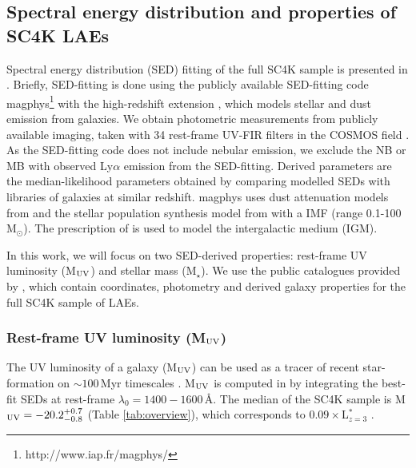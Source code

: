 \documentclass[a4paper,fleqn,usenatbib]{mnras}
\begin{document}
\subsection{Spectral energy distribution and properties of SC4K LAEs}
Spectral energy distribution (SED) fitting of the full SC4K sample is presented in \cite{Santos2020}. Briefly, SED-fitting is done using the publicly available SED-fitting code {\sc magphys}\footnote{http://www.iap.fr/magphys/} \citep{daCunha2008,daCunha2012} with the high-redshift extension \cite[see][]{daCunha2015}, which models stellar and dust emission from galaxies. We obtain photometric measurements from publicly available imaging, taken with 34 rest-frame UV-FIR filters in the COSMOS field  \citep{Capak2007,McCracken2012,Steinhardt2014,Sanders2007,Lutz2011,Oliver2012}. As the SED-fitting code does not include nebular emission, we exclude the NB or MB with observed Ly$\alpha$ emission from the SED-fitting. Derived parameters are the median-likelihood parameters obtained by comparing modelled SEDs with libraries of galaxies at similar redshift. {\sc magphys} uses dust attenuation models from \cite{Charlot2000} and the stellar population synthesis model from \cite{Bruzual2003} with a \cite{Chabrier2003} IMF (range 0.1-100 M$_\odot$). The prescription of \cite{Madau1995} is used to model the intergalactic medium (IGM).

In this work, we will focus on two SED-derived properties: rest-frame UV luminosity (M$_{\rm UV}$) and stellar mass (M$_\star$). We use the public catalogues provided by \cite{Santos2020}, which contain coordinates, photometry and derived galaxy properties for the full SC4K sample of LAEs.

\subsubsection{Rest-frame UV luminosity {\rm (M$_{\rm UV}$)}} \label{subsec:muv}

The UV luminosity of a galaxy (M$_{\rm UV}$) can be used as a tracer of recent star-formation on $\sim100$\,Myr timescales \citep[e.g.][]{Boselli2001,Salim2009}. M$_{\rm UV}$ is computed in \cite{Santos2020} by integrating the best-fit SEDs at rest-frame $\lambda_0=1400-1600$\,\AA. The median of the SC4K sample is M$_{\rm UV}=-20.2^{+0.7}_{-0.8}$ (Table \ref{tab:overview}), which corresponds to $0.09\times$L$_{z=3}^*$ \citep{Steidel1999}.
\end{document}
